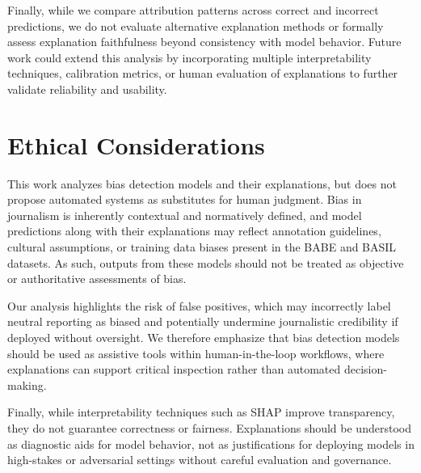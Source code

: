 \documentclass[11pt]{article}
\begin{document}
Finally, while we compare attribution patterns across correct and incorrect predictions, we do not evaluate alternative explanation methods or formally assess explanation faithfulness beyond consistency with model behavior. Future work could extend this analysis by incorporating multiple interpretability techniques, calibration metrics, or human evaluation of explanations to further validate reliability and usability.

\section{Ethical Considerations}

This work analyzes bias detection models and their explanations, but does not propose automated systems as substitutes for human judgment. Bias in journalism is inherently contextual and normatively defined, and model predictions along with their explanations may reflect annotation guidelines, cultural assumptions, or training data biases present in the BABE and BASIL datasets. As such, outputs from these models should not be treated as objective or authoritative assessments of bias.

Our analysis highlights the risk of false positives, which may incorrectly label neutral reporting as biased and potentially undermine journalistic credibility if deployed without oversight. We therefore emphasize that bias detection models should be used as assistive tools within human-in-the-loop workflows, where explanations can support critical inspection rather than automated decision-making.

Finally, while interpretability techniques such as SHAP improve transparency, they do not guarantee correctness or fairness. Explanations should be understood as diagnostic aids for model behavior, not as justifications for deploying models in high-stakes or adversarial settings without careful evaluation and governance.

%



\end{document}
